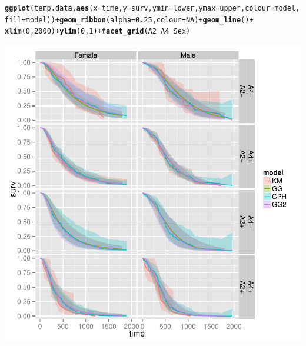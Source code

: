 \documentclass{article}\usepackage[]{graphicx}\usepackage[]{color}
\makeatletter
\def\maxwidth{ %
  \ifdim\Gin@nat@width>\linewidth
    \linewidth
  \else
    \Gin@nat@width
  \fi
}
\newcommand{\hlnum}[1]{\textcolor[rgb]{0.686,0.059,0.569}{#1}}%
\newcommand{\hlopt}[1]{\textcolor[rgb]{0,0,0}{#1}}%
\newcommand{\hlstd}[1]{\textcolor[rgb]{0.345,0.345,0.345}{#1}}%
\newcommand{\hlkwc}[1]{\textcolor[rgb]{0.333,0.667,0.333}{#1}}%
\newcommand{\hlkwd}[1]{\textcolor[rgb]{0.737,0.353,0.396}{\textbf{#1}}}%
\newenvironment{kframe}{%
 \def\at@end@of@kframe{}%
 \ifinner\ifhmode%
  \def\at@end@of@kframe{\end{minipage}}%
  \begin{minipage}{\columnwidth}%
 \fi\fi%
 \def\FrameCommand##1{\hskip\@totalleftmargin \hskip-\fboxsep
 \colorbox{shadecolor}{##1}\hskip-\fboxsep
     \hskip-\linewidth \hskip-\@totalleftmargin \hskip\columnwidth}%
 \MakeFramed {\advance\hsize-\width
   \@totalleftmargin\z@ \linewidth\hsize
   \@setminipage}}%
 {\par\unskip\endMakeFramed%
 \at@end@of@kframe}
\newenvironment{knitrout}{}{} %
\makeatother
\begin{document}
\begin{knitrout}
{}


\begin{kframe}\begin{alltt}
\hlkwd{ggplot}\hlstd{(temp.data,} \hlkwd{aes}\hlstd{(}\hlkwc{x} \hlstd{= time,} \hlkwc{y} \hlstd{= surv,} \hlkwc{ymin} \hlstd{= lower,} \hlkwc{ymax} \hlstd{= upper,} \hlkwc{colour} \hlstd{= model,}
    \hlkwc{fill} \hlstd{= model))} \hlopt{+} \hlkwd{geom_ribbon}\hlstd{(}\hlkwc{alpha} \hlstd{=} \hlnum{0.25}\hlstd{,} \hlkwc{colour} \hlstd{=} \hlnum{NA}\hlstd{)} \hlopt{+} \hlkwd{geom_line}\hlstd{()} \hlopt{+}
    \hlkwd{xlim}\hlstd{(}\hlnum{0}\hlstd{,} \hlnum{2000}\hlstd{)} \hlopt{+} \hlkwd{ylim}\hlstd{(}\hlnum{0}\hlstd{,} \hlnum{1}\hlstd{)} \hlopt{+} \hlkwd{facet_grid}\hlstd{(A2} \hlopt{~} \hlstd{A4} \hlopt{~} \hlstd{Sex)}
\end{alltt}


{\ttfamily\noindent\color{warningcolor}{\#\# Warning: Removed 3 rows containing missing values (geom\_path).}}

{\ttfamily\noindent\color{warningcolor}{\#\# Warning: Removed 3 rows containing missing values (geom\_path).}}

{\ttfamily\noindent\color{warningcolor}{\#\# Warning: Removed 2 rows containing missing values (geom\_path).}}

{\ttfamily\noindent\color{warningcolor}{\#\# Warning: Removed 2 rows containing missing values (geom\_path).}}\end{kframe}

{\centering \includegraphics[width=\maxwidth]{figure/final-fit-assessment-2-2} 

}



\end{knitrout}
\end{document}
